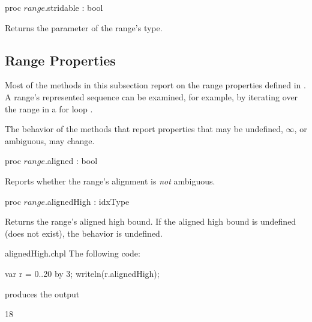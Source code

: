 \begin{protohead}
proc $range$.stridable : bool
\end{protohead}
\begin{protobody}
Returns the  parameter of the range's type.
\end{protobody}

\subsection{Range Properties}
\label{Range_Properties}

Most of the methods in this subsection report on
the range properties defined in .
A range's represented sequence can be examined, for example,
by iterating over the range in a for loop .

\begin{openissue}
The behavior of the methods that report properties that may be
undefined, $\infty$, or ambiguous, may change.
\end{openissue}

\begin{protohead}
proc $range$.aligned : bool
\end{protohead}
\begin{protobody}
Reports whether the range's alignment is \emph{not} ambiguous.
\end{protobody}

\begin{protohead}
proc $range$.alignedHigh : idxType
\end{protohead}
\begin{protobody}
Returns the range's aligned high bound.
If the aligned high bound is undefined (does not exist),
the behavior is undefined.
\end{protobody}
\begin{chapelexample}{alignedHigh.chpl}
The following code:
\begin{chapel}
var r = 0..20 by 3;
writeln(r.alignedHigh);
\end{chapel}
produces the output
\begin{chapelprintoutput}
18
\end{chapelprintoutput}
\end{chapelexample}

